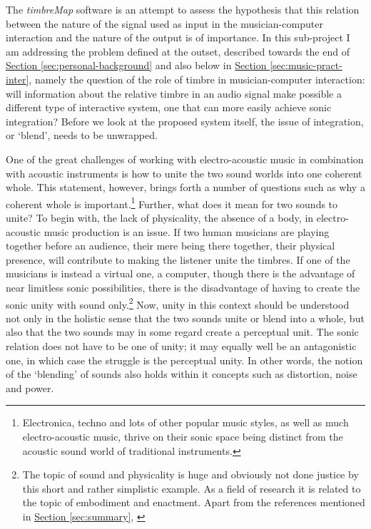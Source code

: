 The \emph{timbreMap} software is an attempt to assess the hypothesis that this relation between the nature of the signal used as input in the musician-computer interaction and the nature of the output is of importance. In this sub-project I am addressing the problem defined at the outset, described towards the end of \hyperlink{sec:target:personal-background-2}{Section \ref*{sec:personal-background}} and also below in \hyperlink{sec:target:music-pract-inter-1}{Section \ref*{sec:music-pract-inter}}, namely the question of the role of timbre in musician-computer interaction: will information about the relative timbre in an audio signal make possible a different type of interactive system, one that can more easily achieve sonic integration? Before we look at the proposed system itself, the issue of integration, or `blend', needs to be unwrapped. 

One of the great challenges of working with electro-acoustic music in combination with acoustic instruments is how to unite the two sound worlds into one coherent whole. This statement, however, brings forth a number of questions such as why a coherent whole is important.\footnote{Electronica, techno and lots of other popular music styles, as well as much electro-acoustic music, thrive on their sonic space being distinct from the acoustic sound world of traditional instruments.} Further, what does it mean for two sounds to unite? To begin with, the lack of physicality, the absence of a body, in electro-acoustic music production is an issue. If two human musicians are playing together before an audience, their mere being there together, their physical presence, will contribute to making the listener unite the timbres. If one of the musicians is instead a virtual one, a computer, though there is the advantage of near limitless sonic possibilities, there is the disadvantage of having to create the sonic unity with sound only.\footnote{The topic of sound and physicality is huge and obviously not done justice by this short and rather simplistic example. As a field of research it is related to the topic of embodiment and enactment. Apart from the references mentioned in \hyperref[sec:summary]{Section \ref*{sec:summary}}, \cite[see][chap. 1, --30]{gill08}} Now, unity in this context should be understood not only in the holistic sense that the two sounds unite or blend into a whole, but also that the two sounds may in some regard create a perceptual unit. The sonic relation does not have to be one of unity; it may equally well be an antagonistic one, in which case the struggle is the perceptual unity. In other words, the notion of the `blending' of sounds also holds within it concepts such as distortion, noise and power.

